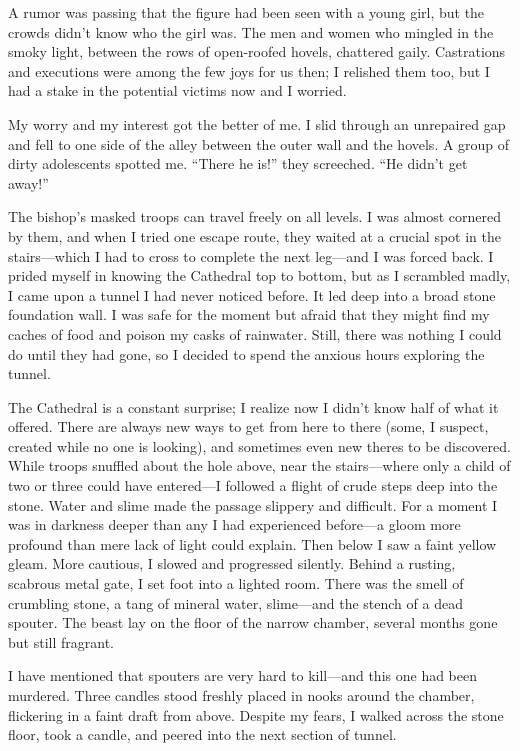 A rumor was passing that the figure had been seen with a young girl, but the crowds didn't know who the girl was. The men and women who mingled in the smoky light, between the rows of open-roofed hovels, chattered gaily. Castrations and executions were among the few joys for us then; I relished them too, but I had a stake in the potential victims now and I worried.

My worry and my interest got the better of me. I slid through an unrepaired gap and fell to one side of the alley between the outer wall and the hovels. A group of dirty adolescents spotted me. ``There he is!'' they screeched. ``He didn't get away!''

The bishop's masked troops can travel freely on all levels. I was almost cornered by them, and when I tried one escape route, they waited at a crucial spot in the stairs—which I had to cross to complete the next leg—and I was forced back. I prided myself in knowing the Cathedral top to bottom, but as I scrambled madly, I came upon a tunnel I had never noticed before. It led deep into a broad stone foundation wall. I was safe for the moment but afraid that they might find my caches of food and poison my casks of rainwater. Still, there was nothing I could do until they had gone, so I decided to spend the anxious hours exploring the tunnel.

The Cathedral is a constant surprise; I realize now I didn't know half of what it offered. There are always new ways to get from here to there (some, I suspect, created while no one is looking), and sometimes even new theres to be discovered. While troops snuffled about the hole above, near the stairs—where only a child of two or three could have entered—I followed a flight of crude steps deep into the stone. Water and slime made the passage slippery and difficult. For a moment I was in darkness deeper than any I had experienced before—a gloom more profound than mere lack of light could explain. Then below I saw a faint yellow gleam. More cautious, I slowed and progressed silently. Behind a rusting, scabrous metal gate, I set foot into a lighted room. There was the smell of crumbling stone, a tang of mineral water, slime—and the stench of a dead spouter. The beast lay on the floor of the narrow chamber, several months gone but still fragrant.

I have mentioned that spouters are very hard to kill—and this one had been murdered. Three candles stood freshly placed in nooks around the chamber, flickering in a faint draft from above. Despite my fears, I walked across the stone floor, took a candle, and peered into the next section of tunnel.

